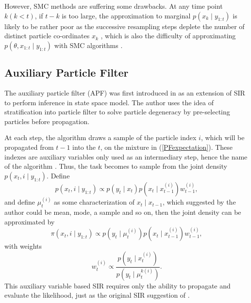 However, SMC methods are suffering some drawbacks. At any time point $k (k<t)$, if $t-k$ is too large, the approximation to marginal $p(x_k\mid y_{1:t})$ is likely to be rather poor as the successive resampling steps deplete the number of distinct particle co-ordinates $x_k$ \cite{andrieu2010particle}, which is also the difficulty of approximating $p(\theta,x_{1:t}\mid y_{1:t})$ with SMC algorithms 
\cite{andrieu1999sequential} \cite{fearnhead2002markov} \cite{storvik2002particle}. 




\subsection{Auxiliary Particle Filter}

The auxiliary particle filter (APF) was first introduced in \cite{pitt1999filtering} as an extension of SIR to perform inference in state space model. The author uses the idea of stratification into particle filter to solve particle degeneracy by pre-selecting particles before propagation. 

At each step, the algorithm draws a sample of the particle index $i$, which will be propagated from $t-1$ into the $t$, on the mixture in (\ref{PFexpectation}). These indexes are auxiliary variables only used as an intermediary step, hence the name of the algorithm \cite{pitt1999filtering}. Thus, the task becomes to sample from the joint density $p(x_t,i\mid y_{1:t})$. Define 
\begin{equation}
p(x_t,i\mid y_{1:t})\propto p(y_t\mid x_t)p(x_t\mid x_{t-1}^{(i)})w_{t-1}^{(i)}, 
\end{equation}
and define $\mu_t^{(i)}$ as some characterization of $x_t\mid x_{t-1}$, which suggested by the author could be mean, mode, a sample and so on, then the joint density can be approximated by  
\begin{equation}
\pi(x_t,i\mid y_{1:t})\propto p(y_t\mid \mu_t^{(i)})p(x_t\mid x_{t-1}^{(i)})w_{t-1}^{(i)}, 
\end{equation}
with weights
\begin{equation*}
w_t^{(i)}\propto \frac{ p(y_t\mid x_t^{(i)})  }{  p(y_t\mid\mu_t^{k(i)})   }.
\end{equation*}
This auxiliary variable based SIR requires only the ability to propagate and evaluate the likelihood, just as the original SIR suggestion of \cite{gordon1993novel}.  

